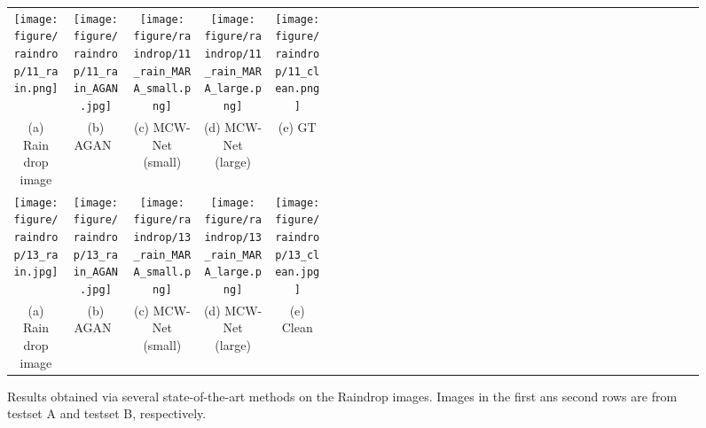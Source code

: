 \documentclass[a4paper,fleqn]{cas-dc}
\begin{document}
\begin{figure*}
	\centering
	\setlength{\tabcolsep}{0pt}
	\footnotesize{
	\begin{tabular}{cccccccclcccccccclcccccccclcccccccclccccccccl}
		\multicolumn{3}{c}{\texttt{[image: figure/raindrop/11\_rain.png]}}\ &
		\multicolumn{3}{c}{\texttt{[image: figure/raindrop/11\_rain\_AGAN.jpg]}}\ &
		\multicolumn{3}{c}{\texttt{[image: figure/raindrop/11\_rain\_MARA\_small.png]}}\ &
		\multicolumn{3}{c}{\texttt{[image: figure/raindrop/11\_rain\_MARA\_large.png]}}\ &
		\multicolumn{3}{c}{\texttt{[image: figure/raindrop/11\_clean.png]}}\\
		
		\multicolumn{3}{c}{(a) Rain drop image} &
		\multicolumn{3}{c}{(b) AGAN~\cite{qian2018attentive}} &
		\multicolumn{3}{c}{(c) MCW-Net (small)} &
		\multicolumn{3}{c}{(d) MCW-Net (large)} &
		\multicolumn{3}{c}{(e) GT} \\

		\multicolumn{3}{c}{\texttt{[image: figure/raindrop/13\_rain.jpg]}}\ &
		\multicolumn{3}{c}{\texttt{[image: figure/raindrop/13\_rain\_AGAN.jpg]}}\ &
		\multicolumn{3}{c}{\texttt{[image: figure/raindrop/13\_rain\_MARA\_small.png]}}\ &
		\multicolumn{3}{c}{\texttt{[image: figure/raindrop/13\_rain\_MARA\_large.png]}}\ &
		\multicolumn{3}{c}{\texttt{[image: figure/raindrop/13\_clean.jpg]}}\\
		
		\multicolumn{3}{c}{(a) Rain drop image} &
		\multicolumn{3}{c}{(b) AGAN~\cite{qian2018attentive}} &
		\multicolumn{3}{c}{(c) MCW-Net (small)} &
		\multicolumn{3}{c}{(d) MCW-Net (large)} &
		\multicolumn{3}{c}{(e) Clean} \\


	\end{tabular}}
	\caption{ Results obtained via several state-of-the-art methods on the Raindrop images. Images in the first ans second rows are from testset A and testset B, respectively. }
	\label{fig:results raindrop}
\end{figure*}
\end{document}
